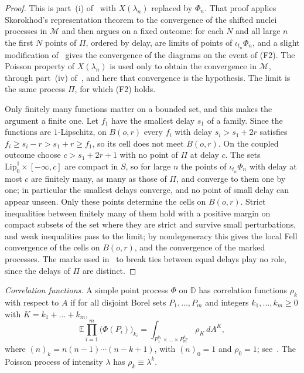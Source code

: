 \documentclass[11pt]{amsart}
\theoremstyle{definition}
\theoremstyle{remark}
\newcommand{\D}{\mathbb{D}}
\newcommand{\E}{\mathbb{E}}
\newcommand{\M}{\mathcal{M}}
\newcommand{\Lip}{\mathrm{Lip}}
\newcommand{\area}{A}
\begin{document}
\begin{proof}
This is part~(i) of~\cite[Proposition~3.3]{DK26} with $X(\lambda_n)$ replaced by $\Phi_n$. That proof applies
Skorokhod's representation theorem to the convergence of the shifted nuclei processes in $\M$ and then argues on a
fixed outcome: for each $N$ and all large $n$ the first $N$ points of $\Pi$, ordered by delay, are limits of points of
$\iota_{t_n}\Phi_n$, and a slight modification of~\cite[Theorem~2.3]{DCE26} gives the convergence of the diagrams on the
event of (F2). The Poisson property of $X(\lambda_n)$ is used only to obtain the convergence in $\M$, through part~(iv)
of~\cite[Proposition~3.2]{DK26}, and here that convergence is the hypothesis. The limit is the same process $\Pi$, for
which (F2) holds.

Only finitely many functions matter on a bounded set, and this makes the argument a finite one. Let $f_1$ have the
smallest delay $s_1$ of a family. Since the functions are $1$-Lipschitz, on $B(o,r)$ every $f_i$ with delay $s_i>s_1+2r$
satisfies $f_i\ge s_i-r>s_1+r\ge f_1$, so its cell does not meet $B(o,r)$. On the coupled outcome choose $c>s_1+2r+1$
with no point of $\Pi$ at delay $c$. The sets $\Lip^1_0\times[-\infty,c]$ are compact in $S$, so for large $n$ the
points of $\iota_{t_n}\Phi_n$ with delay at most $c$ are finitely many, as many as those of $\Pi$, and converge to them
one by one; in particular the smallest delays converge, and no point of small delay can appear unseen. Only these
points determine the cells on $B(o,r)$. Strict inequalities between finitely many of them hold with a positive margin
on compact subsets of the set where they are strict and survive small perturbations, and weak inequalities pass to the limit; by nondegeneracy this gives
the local Fell convergence of the cells on $B(o,r)$, and the convergence of the marked processes.
The marks used in~\cite{DK26} to break ties between equal delays play no role, since the delays of $\Pi$ are distinct.
\end{proof}

\emph{Correlation functions.} A simple point process $\Phi$ on $\D$ has correlation functions $\rho_k$ with respect to
$\area$ if for all disjoint Borel sets $P_1,\dots,P_m$ and integers $k_1,\dots,k_m\ge0$ with $K=k_1+\dots+k_m$,
\begin{equation}\label{eq:corr}
  \E\prod_{i=1}^m\bigl(\Phi(P_i)\bigr)_{k_i}=\int_{P_1^{k_1}\times\dots\times P_m^{k_m}}\rho_K\,d\area^{K},
\end{equation}
where $(n)_k=n(n-1)\cdots(n-k+1)$, with $(n)_0=1$ and $\rho_0=1$; see~\cite[Section~1.2]{HKPV09}. The Poisson process of intensity $\lambda$ has
$\rho_k\equiv\lambda^k$.
\end{document}

